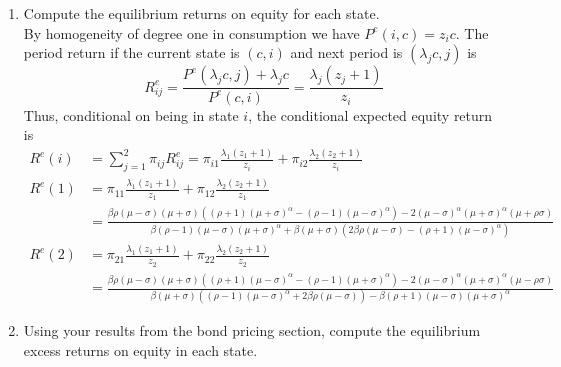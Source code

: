 \documentclass[french]{article}
\begin{document}
\begin{enumerate}[I]
\begin{equation*}
\begin{split}
{			(\mu -\sigma )\right)+\beta  (\mu +\sigma ) \left(2
			\beta  \rho  (\mu -\sigma )-(\rho +1) (\mu -\sigma
			)^{\alpha }\right)}= 14.268\\
		z_2 & =  \frac{\beta  (\rho +1) (\mu -\sigma ) (\mu +\sigma
			)^{\alpha }+\beta  (\mu +\sigma ) \left((1-\rho )
			(\mu -\sigma )^{\alpha }+2 \beta  \rho  (\sigma
			-\mu )\right)}{(\mu +\sigma )^{\alpha } \left(2
			(\mu -\sigma )^{\alpha }-\beta  (\rho +1) (\mu
			-\sigma )\right)+\beta  (\mu +\sigma ) \left(2
			\beta  \rho  (\mu -\sigma )-(\rho +1) (\mu -\sigma
			)^{\alpha }\right)}=14.1436\\
		\end{split}
	\end{equation*}
	\item Compute the equilibrium returns on equity for each state. \\
	By homogeneity of degree one in consumption we have $P^e(i, c) = z_i c$. The period return if the current state is $(c, i)$ and next period is $(\lambda_jc, j)$ is 
	\begin{equation*}
		R^e_{ij} = \frac{P^e(\lambda_j c, j) + \lambda_j c}{P^e(c, i)} = \frac{\lambda_j(z_j + 1)}{z_i}
	\end{equation*}
	Thus, conditional on being in state $i$, the conditional expected equity return is 
	\begin{equation*}
	\begin{split}
			R^e(i) &= \sum_{j=1}^{2}\pi_{ij}R^e_{ij} = \pi_{i1}\frac{\lambda_1(z_1 + 1)}{z_i} + \pi_{i2}\frac{\lambda_2(z_2 + 1)}{z_i}\\
			R^e(1) &= \pi_{11}\frac{\lambda_1(z_1 + 1)}{z_1} + \pi_{12}\frac{\lambda_2(z_2 + 1)}{z_1}\\
			&=\frac{\beta  \rho  (\mu -\sigma ) (\mu +\sigma )
				\left((\rho +1) (\mu +\sigma )^{\alpha }-(\rho -1)
				(\mu -\sigma )^{\alpha }\right)-2 (\mu -\sigma
				)^{\alpha } (\mu +\sigma )^{\alpha } (\mu +\rho 
				\sigma )}{\beta  (\rho -1) (\mu -\sigma ) (\mu
				+\sigma )^{\alpha }+\beta  (\mu +\sigma ) \left(2
				\beta  \rho  (\mu -\sigma )-(\rho +1) (\mu -\sigma
				)^{\alpha }\right)}\\
			R^e(2) &= \pi_{21}\frac{\lambda_1(z_1 + 1)}{z_2} + \pi_{22}\frac{\lambda_2(z_2 + 1)}{z_2}\\
			&=\frac{\beta  \rho  (\mu -\sigma ) (\mu +\sigma )
				\left((\rho +1) (\mu -\sigma )^{\alpha }-(\rho -1)
				(\mu +\sigma )^{\alpha }\right)-2 (\mu -\sigma
				)^{\alpha } (\mu +\sigma )^{\alpha } (\mu -\rho 
				\sigma )}{\beta  (\mu +\sigma ) \left((\rho -1)
				(\mu -\sigma )^{\alpha }+2 \beta  \rho  (\mu
				-\sigma )\right)-\beta  (\rho +1) (\mu -\sigma )
				(\mu +\sigma )^{\alpha }}
	\end{split}
	\end{equation*}
	\item Using your results from the bond pricing section, compute the equilibrium excess returns on equity in each state. \\
	

\end{enumerate}
\end{document}
